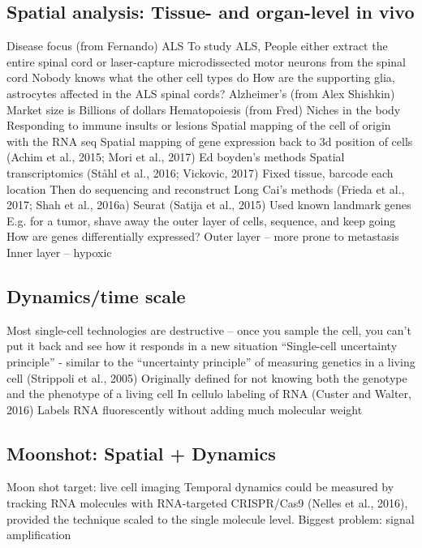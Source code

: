 \subsection{Spatial analysis: Tissue- and organ-level in vivo}

Disease focus (from Fernando)
ALS
To study ALS, People either extract the entire spinal cord or laser-capture microdissected motor neurons from the spinal cord
Nobody knows what the other cell types do
How are the supporting glia, astrocytes affected in the ALS spinal cords?
Alzheimer's (from Alex Shishkin)
Market size is Billions of dollars
Hematopoiesis (from Fred)
Niches in the body
Responding to immune insults or lesions
Spatial mapping of the cell of origin with the RNA seq
Spatial mapping of gene expression back to 3d position of cells (Achim et al., 2015; Mori et al., 2017)
Ed boyden's methods
Spatial transcriptomics (Ståhl et al., 2016; Vickovic, 2017)
Fixed tissue, barcode each location
Then do sequencing and reconstruct
Long Cai's methods (Frieda et al., 2017; Shah et al., 2016a)
Seurat (Satija et al., 2015)
Used known landmark genes
E.g. for a tumor, shave away the outer layer of cells, sequence, and keep going
How are genes differentially expressed?
Outer layer -- more prone to metastasis
Inner layer -- hypoxic

\subsection{Dynamics/time scale}

Most single-cell technologies are destructive -- once you sample the cell, you can't put it back and see how it responds in a new situation
``Single-cell uncertainty principle'' - similar to the ``uncertainty principle'' of measuring genetics in a living cell (Strippoli et al., 2005)
Originally defined for not knowing both the genotype and the phenotype of a living cell
In cellulo labeling of RNA (Custer and Walter, 2016)
Labels RNA fluorescently without adding much molecular weight


\subsection{Moonshot: Spatial + Dynamics}

Moon shot target: live cell imaging
Temporal dynamics could be measured by tracking RNA molecules with RNA-targeted CRISPR/Cas9 (Nelles et al., 2016), provided the technique scaled to the single molecule level.
Biggest problem: signal amplification

